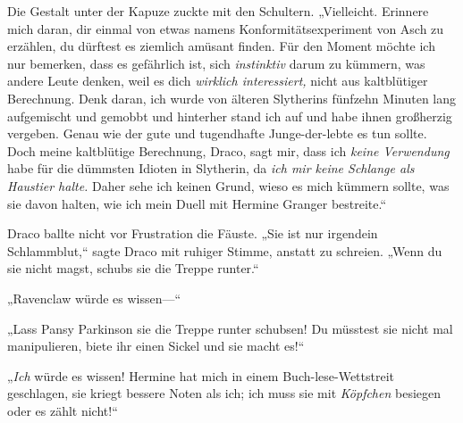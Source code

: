 Die Gestalt unter der Kapuze zuckte mit den Schultern. „Vielleicht. Erinnere mich daran, dir einmal von etwas namens Konformitätsexperiment von Asch zu erzählen, du dürftest es ziemlich amüsant finden. Für den Moment möchte ich nur bemerken, dass es gefährlich ist, sich \emph{instinktiv} darum zu kümmern, was andere Leute denken, weil es dich \emph{wirklich interessiert,} nicht aus kaltblütiger Berechnung. Denk daran, ich wurde von älteren Slytherins fünfzehn Minuten lang aufgemischt und gemobbt und hinterher stand ich auf und habe ihnen großherzig vergeben. Genau wie der gute und tugendhafte Junge-der-lebte es tun sollte. Doch meine kaltblütige Berechnung, Draco, sagt mir, dass ich \emph{keine Verwendung} habe für die dümmsten Idioten in Slytherin, da \emph{ich mir keine Schlange als Haustier halte.} Daher sehe ich keinen Grund, wieso es mich kümmern sollte, was sie davon halten, wie ich mein Duell mit Hermine Granger bestreite.“

Draco ballte nicht vor Frustration die Fäuste. „Sie ist nur irgendein Schlammblut,“ sagte Draco mit ruhiger Stimme, anstatt zu schreien. „Wenn du sie nicht magst, schubs sie die Treppe runter.“

„Ravenclaw würde es wissen—“

„Lass Pansy Parkinson sie die Treppe runter schubsen! Du müsstest sie nicht mal manipulieren, biete ihr einen Sickel und sie macht es!“

„\emph{Ich} würde es wissen! Hermine hat mich in einem Buch-lese-Wettstreit geschlagen, sie kriegt bessere Noten als ich; ich muss sie mit \emph{Köpfchen} besiegen oder es zählt nicht!“

